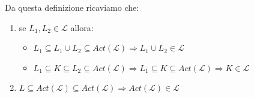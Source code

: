 		Da questa definizione ricaviamo che:
		\begin{enumerate}
			\item se $L_1,L_2 \in \mathcal{L}$ allora: 
				\begin{itemize}
					\item  $L_1 \subseteq L_1 \cup L_2 \subseteq Act(\mathcal{L}) \Rightarrow L_1 \cup L_2 \in \mathcal{L}$
					\item $L_1 \subseteq K \subseteq L_2 \subseteq Act(\mathcal{L}) \Rightarrow L_1 \subseteq K \subseteq Act(\mathcal{L}) \Rightarrow K\in \mathcal{L}$
				\end{itemize}
			\item $L \subseteq Act(\mathcal{L}) \subseteq Act(\mathcal{L}) \Rightarrow Act(\mathcal{L}) \in \mathcal{L}$
		\end{enumerate}